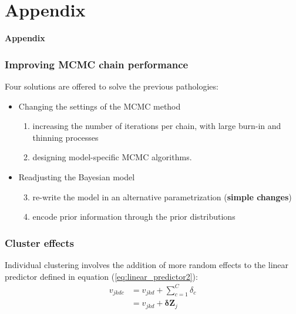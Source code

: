 \documentclass[nonav,sleutel]{beamer}
\begin{document}
	\section*{Appendix}
	\begin{frame}
		\LARGE{\textbf{Appendix}}
	\end{frame}
	\begin{frame}
		\frametitle{Improving MCMC chain performance}
		Four solutions are offered to solve the previous pathologies:
		\begin{itemize}
			\item Changing the settings of the MCMC method
			\begin{enumerate}
				\item increasing the number of iterations per chain, with large burn-in and thinning processes
				\item designing model-specific MCMC algorithms.
			\end{enumerate}
			\item Readjusting the Bayesian model
			\begin{enumerate}
				\setcounter{enumi}{2}
				\item re-write the model in an alternative parametrization (\textbf{simple changes})
				\item encode prior information through the prior distributions
			\end{enumerate}
		\end{itemize}
	\end{frame}
	\begin{frame}
		\frametitle{Cluster effects}
		Individual clustering involves the addition of more random effects to the linear predictor defined in equation (\ref{eq:linear_predictor2}):
		\begin{equation} \label{eq:linear_predictor4}
			\begin{split}
				v_{jkdc} &= v_{jkd} + \sum_{c=1}^{C} \delta_{c}  \\
				&= v_{jkd} + \pmb{\delta} \mathbf{Z}_{j}
			\end{split}
		\end{equation}
	\end{frame}
\end{document}
